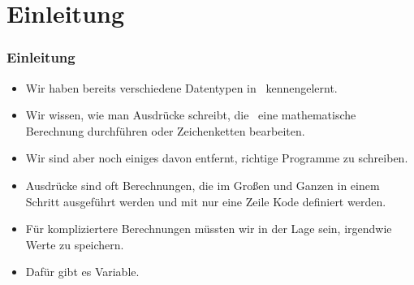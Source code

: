 \documentclass[aspectratio=169,mathserif,notheorems]{beamer}%
\subtitle{13.~Variablen:~Wertzuweisung}%
\begin{document}
%
%
\startPresentation%
%
\section{Einleitung}%
\begin{frame}%
\frametitle{Einleitung}%
\begin{itemize}%
\item Wir haben bereits verschiedene Datentypen in \python\ kennengelernt.%
\item<2-> Wir wissen, wie man Ausdrücke schreibt, die \DEzB~eine mathematische Berechnung durchführen oder Zeichenketten bearbeiten.%
\item<3-> Wir sind aber noch einiges davon entfernt, richtige Programme zu schreiben.%
\item<4-> Ausdrücke sind oft Berechnungen, die im Großen und Ganzen in einem Schritt ausgeführt werden und mit nur eine Zeile Kode definiert werden.%
\item<5-> Für kompliziertere Berechnungen müssten wir in der Lage sein, irgendwie Werte zu speichern.%
\item<6-> Dafür gibt es \alert{Variable}.
\end{itemize}%
\end{frame}%
%
\end{document}
